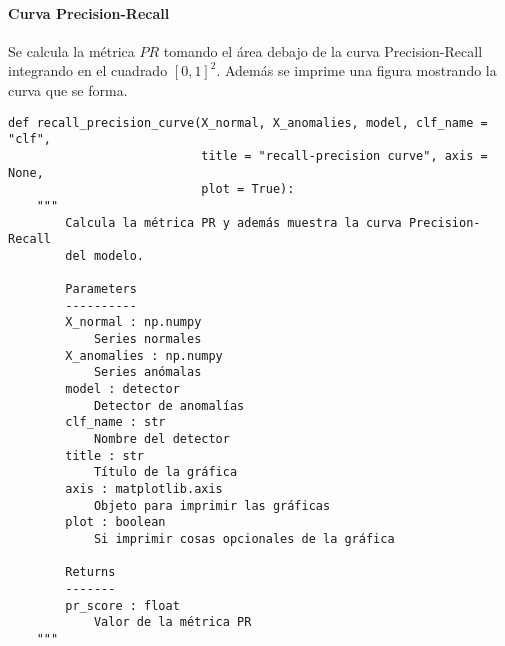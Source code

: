 \paragraph{Curva Precision-Recall}

Se calcula la métrica $PR$ tomando el área debajo de la curva Precision-Recall integrando en el cuadrado $[0, 1]^2$. Además se imprime una figura mostrando la curva que se forma.

\begin{lstlisting}
def recall_precision_curve(X_normal, X_anomalies, model, clf_name = "clf",
                           title = "recall-precision curve", axis = None,
                           plot = True):
    """
        Calcula la métrica PR y además muestra la curva Precision-Recall
        del modelo.

        Parameters
        ----------
        X_normal : np.numpy
            Series normales
        X_anomalies : np.numpy
            Series anómalas
        model : detector
            Detector de anomalías
        clf_name : str
            Nombre del detector
        title : str
            Título de la gráfica
        axis : matplotlib.axis
            Objeto para imprimir las gráficas
        plot : boolean
            Si imprimir cosas opcionales de la gráfica

        Returns
        -------
        pr_score : float
            Valor de la métrica PR
    """
\end{lstlisting}


\endinput
